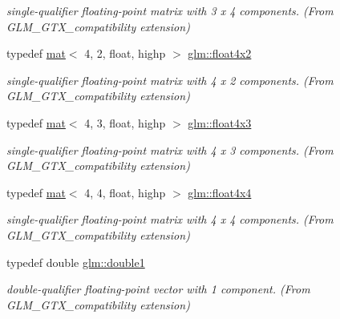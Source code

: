 \begin{DoxyCompactItemize}
\begin{DoxyCompactList}\small\item\em single-\/qualifier floating-\/point matrix with 3 x 4 components. (From G\+L\+M\+\_\+\+G\+T\+X\+\_\+compatibility extension) \end{DoxyCompactList}\item 
\mbox{\label{group__gtx__compatibility_gac7ba369299599a807491b9e871a0184e}} 
typedef \hyperlink{structglm_1_1mat}{mat}$<$ 4, 2, float, highp $>$ \hyperlink{group__gtx__compatibility_gac7ba369299599a807491b9e871a0184e}{glm\+::float4x2}
\begin{DoxyCompactList}\small\item\em single-\/qualifier floating-\/point matrix with 4 x 2 components. (From G\+L\+M\+\_\+\+G\+T\+X\+\_\+compatibility extension) \end{DoxyCompactList}\item 
\mbox{\label{group__gtx__compatibility_ga656a2d21cf92696b10063da4f431eecd}} 
typedef \hyperlink{structglm_1_1mat}{mat}$<$ 4, 3, float, highp $>$ \hyperlink{group__gtx__compatibility_ga656a2d21cf92696b10063da4f431eecd}{glm\+::float4x3}
\begin{DoxyCompactList}\small\item\em single-\/qualifier floating-\/point matrix with 4 x 3 components. (From G\+L\+M\+\_\+\+G\+T\+X\+\_\+compatibility extension) \end{DoxyCompactList}\item 
\mbox{\label{group__gtx__compatibility_ga32ecd052006dea588730d2a077c5896c}} 
typedef \hyperlink{structglm_1_1mat}{mat}$<$ 4, 4, float, highp $>$ \hyperlink{group__gtx__compatibility_ga32ecd052006dea588730d2a077c5896c}{glm\+::float4x4}
\begin{DoxyCompactList}\small\item\em single-\/qualifier floating-\/point matrix with 4 x 4 components. (From G\+L\+M\+\_\+\+G\+T\+X\+\_\+compatibility extension) \end{DoxyCompactList}\item 
\mbox{\label{group__gtx__compatibility_gab8b88350212cea916857cb2f49b8a29f}} 
typedef double \hyperlink{group__gtx__compatibility_gab8b88350212cea916857cb2f49b8a29f}{glm\+::double1}
\begin{DoxyCompactList}\small\item\em double-\/qualifier floating-\/point vector with 1 component. (From G\+L\+M\+\_\+\+G\+T\+X\+\_\+compatibility extension) \end{DoxyCompactList}\item 

\end{DoxyCompactItemize}

